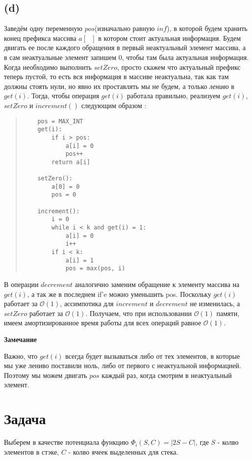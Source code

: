\documentclass{article}
\begin{document}
\subsection*{(d)}
Заведём одну переменную $pos$(изначально равную $inf$), в которой будем хранить конец префикса массива $a[\mbox{ }]$ в котором стоит актуальная информация. Будем двигать ее после каждого обращения в первый неактуальный элемент массива, а в сам неактуальные элемент запишем 0, чтобы там была актуальная информация. Когда необходимо выполнить $setZero$, просто скажем что актуальный префикс теперь пустой, то есть вся информация в массиве неактуальна, так как там должны стоять нули, но явно их проставлять мы не будем, а только \textit{лениво} в $get(i)$. Тогда, чтобы операция $get(i)$ работала правильно, реализуем $get(i)$, $setZero$ и $increment()$ следующим образом : 
\begin{quote}
\begin{verbatim}
    pos = MAX_INT
    get(i):	
        if i > pos:
            a[i] = 0
            pos++
        return a[i]    
        
    setZero(): 
        a[0] = 0
        pos = 0 
           
    increment():
        i = 0
        while i < k and get(i) = 1:
            a[i] = 0
            i++
        if i < k:
            a[i] = 1
            pos = max(pos, i)
\end{verbatim}
\end{quote}
В операции $decrement$ аналогично заменим обращение к элементу массива на $get(i)$, а так же в последнем if'e можно уменьшить pos.
\newline
Поскольку $get(i)$ работает за $\mathcal{O}(1)$, ассимпотика для $increment$ и $decrement$ не изменилась, а $setZero$ работает за $\mathcal{O}(1)$. Получаем, что при использовании $\mathcal{O}(1)$ памяти, имеем амортизированное время работы для всех операций равное $\mathcal{O}(1)$.
\newline


   \textbf{Замечание}
   
Важно, что $get(i)$ всегда будет вызываться либо от тех элементов, в которые мы уже лениво поставили ноль, либо от первого с неактуальной информацией. Поэтому мы можем двигать $pos$ каждый раз, когда смотрим в неактуальный элемент.
\section*{Задача }
Выберем в качестве потенциала функцию $\Phi_{i}(S, C) = |2S - C|$, где $S$ - колво элементов в стэке, $C$ - колво ячеек выделенных для стека.
\end{document}
